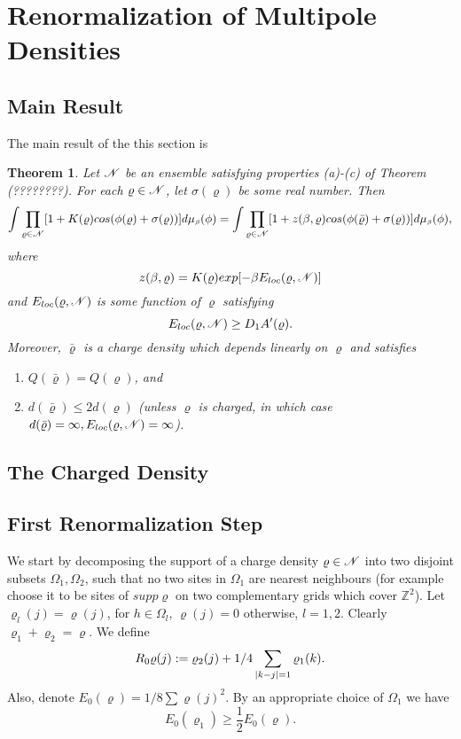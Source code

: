 \documentclass[11pt,reqno]{article}
\DeclarePairedDelimiter\abs{\lvert}{\rvert}%
\newtheorem{thm}{Theorem}[section]
\theoremstyle{definition}
\begin{document}
\section{Renormalization of Multipole Densities}\label{sec:chap4}



\subsection{Main Result}
The main result of the this section is
\begin{thm} \label{thm:thm41}
Let $\mathscr{N}$ be an ensemble satisfying properties (a)-(c) of Theorem (????????). For each $\varrho \in \mathscr{N}$, let $\sigma(\varrho)$ be some real number. Then
\begin{equation}
\int\prod_{\varrho \in \mathscr{N}}[1 + K(\varrho)cos(\phi(\varrho) + \sigma(\varrho))]d\mu_{\text{\tiny$\beta$}}(\phi) = 
\int\prod_{\varrho \in \mathscr{N}}[1 + z(\beta,\varrho)cos(\phi(\bar{\varrho}) + \sigma(\varrho))]d\mu_{\text{\tiny$\beta$}}(\phi), 
\end{equation}
where
$$
z(\beta,\varrho) = K(\varrho)exp[-\beta E_{loc}(\varrho, \mathscr{N})]
$$
and $E_{loc}(\varrho, \mathscr{N})$ is some function of $\varrho$ satisfying 
\begin{equation}
E_{loc}(\varrho, \mathscr{N}) \geq D_1 A^\prime(\varrho).
\end{equation}
Moreover, $\bar{\varrho}$ is a charge density which depends linearly on $\varrho$ and satisfies
\begin{enumerate}[label={\alph*)}]
\item $Q(\bar{\varrho}) = Q(\varrho)$, and
\item $d(\bar{\varrho}) \leq 2d(\varrho)$ (unless $\varrho$ is charged, in which case $d(\bar{\varrho}) = \infty, E_{loc}(\varrho, \mathscr{N}) = \infty$).
\end{enumerate}
\end{thm}

\subsection{The Charged Density}

\subsection{First Renormalization Step}

We start by decomposing the support of a charge density $\varrho \in \mathscr{N}$ into two disjoint subsets $\Omega_1, \Omega_2$, such that no two sites in $\Omega_1$ are nearest neighbours (for example choose it to be sites of $supp\varrho$ on two complementary grids which cover $\mathbb{Z}^2$). Let $\varrho_l(j) = \varrho(j)$, for $h \in \Omega_l$, $\varrho(j)=0$ otherwise, $l=1,2$. Clearly $\varrho_1 + \varrho_2 = \varrho$. We define
$$
R_0\varrho(j) := \varrho_2(j) + 1/4\sum_{\abs{k-j}=1}\varrho_1(k).
$$
Also, denote $E_0(\varrho) = 1/8\sum\varrho(j)^2$. By an appropriate choice of $\Omega_1$ we have
\begin{equation} \label{label:lab419}
E_0(\varrho_1) \geq \frac{1}{2} E_0(\varrho).
\end{equation}
\end{document}

